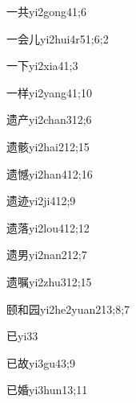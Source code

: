 \begin{verbete}{一共}{yi2gong4}{1;6}
\end{verbete}
\begin{verbete}{一会儿}{yi2hui4r5}{1;6;2}
\end{verbete}
\begin{verbete}{一下}{yi2xia4}{1;3}
\end{verbete}
\begin{verbete}{一样}{yi2yang4}{1;10}
\end{verbete}
\begin{verbete}{遗产}{yi2chan3}{12;6}
\end{verbete}
\begin{verbete}{遗骸}{yi2hai2}{12;15}
\end{verbete}
\begin{verbete}{遗憾}{yi2han4}{12;16}
\end{verbete}
\begin{verbete}{遗迹}{yi2ji4}{12;9}
\end{verbete}
\begin{verbete}{遗落}{yi2lou4}{12;12}
\end{verbete}
\begin{verbete}{遗男}{yi2nan2}{12;7}
\end{verbete}
\begin{verbete}{遗嘱}{yi2zhu3}{12;15}
\end{verbete}
\begin{verbete}{颐和园}{yi2he2yuan2}{13;8;7}
\end{verbete}
\begin{verbete}{已}{yi3}{3}
\end{verbete}
\begin{verbete}{已故}{yi3gu4}{3;9}
\end{verbete}
\begin{verbete}{已婚}{yi3hun1}{3;11}
\end{verbete}
